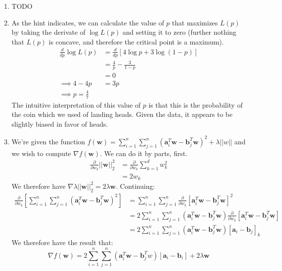 \documentclass[12pt]{article}
\begin{document}
\begin{enumerate}[label=(\alph*)]
  \item  TODO
  
  \item As the hint indicates, we can calculate the value of $p$ that maximizes $L(p)$ by taking the derivate of $\log L(p)$ and setting it to zero (further nothing that $L(p)$ is concave, and therefore the critical point is a maximum).
  \begin{align*}
    \frac{d}{dp}\log L(p) &= \frac{d}{dp}\left[4\log p + 3 \log (1-p)\right] \\
    &= \frac{4}{p} - \frac{3}{1-p} \\
    &= 0 \\
    \implies 4 - 4p &= 3p \\
    \implies p = \frac{4}{7} 
  \end{align*}
  The intuitive interpretation of this value of $p$ is that this is the probability of the coin which we used of landing heads. Given the data, it appears to be slightly biased in favor of heads.

  \item We're given the function $f(\bm{w}) = \sum_{i=1}^n \sum_{j = 1}^n (\bm{a}_i^T\bm{w} - \bm{b}_j^T\bm{w})^2 + \lambda||w||$ and we wish to compute $\nabla f(\bm{w})$. We can do it by parts, first.
  \begin{align*}
    \frac{\partial}{\partial w_k} ||\bm{w}||_2^2 &= \frac{\partial}{\partial w_k} \sum_{k=1}^d w_k^2 \\
    &= 2w_k \tag{ all terms except $w_k$ are zero}
  \end{align*}
  We therefore have $\nabla \lambda ||\bm{w}||_2^2 = 2\lambda\bm{w}$. Continuing:
  \begin{align*}
    \frac{\partial}{\partial w_k}\left[ \sum_{i=1}^n \sum_{j=1}^n (\bm{a}_i^T \bm{w} - \bm{b}_j^T \bm{w})^2 \right] &= \sum_{i=1}^n \sum_{j=1}^n \frac{\partial}{\partial w_k} \left[ \bm{a}_i^T \bm{w} - \bm{b}_j^T \bm{w} \right]^2 \\
    &=  2\sum_{i=1}^n \sum_{j=1}^n (\bm{a}_i^T \bm{w} - \bm{b}_j^T\bm{w})\frac{\partial}{\partial w_k}[\bm{a}_i^T \bm{w} - \bm{b}_j^T \bm {w}] \tag{chain rule} \\
    &= 2 \sum_{i=1}^n \sum_{j=1}^n(\bm{a}_i^T \bm{w} - \bm{b}_j^T \bm{w}) [\bm{a}_i - \bm{b}_j]_k
  \end{align*}
  We therefore have the result that:
  $$
    \nabla f(\bm{w}) = 2\sum_{i=1}^n\sum_{j=1}^n (\bm{a}_i^T \bm{w} - \bm{b}_j^T w)[\bm{a}_i - \bm{b}_i] + 2\lambda \bm{w}
  $$
\end{enumerate}
\end{document}
